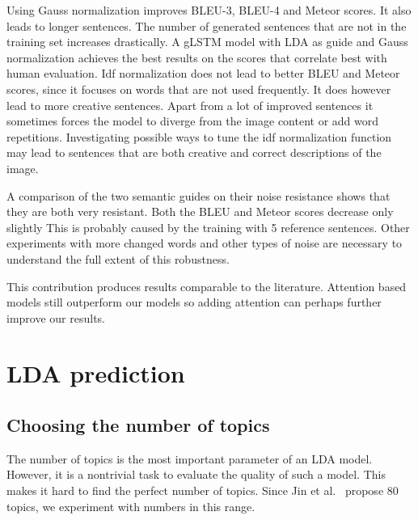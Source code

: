 \documentclass[twoside,twocolumn]{article}
\begin{document}
	Using Gauss normalization improves BLEU-3, BLEU-4 and Meteor scores. It also leads to longer sentences. The number of generated sentences that are not in the training set increases drastically. A gLSTM model with LDA as guide and Gauss normalization achieves the best results on the scores that correlate best with human evaluation. Idf normalization does not lead to better BLEU and Meteor scores, since it focuses on words that are not used frequently. It does however lead to more creative sentences. Apart from a lot of improved sentences it sometimes forces the model to diverge from the image content or add word repetitions. Investigating possible ways to tune the idf normalization function may lead to sentences that are both creative and correct descriptions of the image.
	
	A comparison of the two semantic guides on their noise resistance shows that they are both very resistant. Both the BLEU and Meteor scores decrease only slightly This is probably caused by the training with 5 reference sentences. Other experiments with more changed words and other types of noise are necessary to understand the full extent of this robustness.
	
	This contribution produces results comparable to the literature. Attention based models still outperform our models so adding attention can perhaps further improve our results.
	
	
	
	
	
	
	\clearpage
	\appendix
	\section{LDA prediction}
	\label{appendix:LDA}
	\subsection{Choosing the number of topics}
	The number of topics is the most important parameter of an LDA model. However, it is a nontrivial task to evaluate the quality of such a model. This makes it hard to find the perfect number of topics. Since Jin et al.~\cite{Jin2015} propose 80 topics, we experiment with numbers in this range.
	
\end{document}
